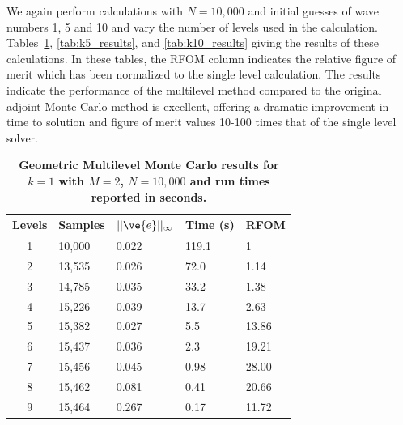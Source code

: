 \documentclass[note]{TechNote}
\begin{document}
We again perform calculations with $N=10,000$ and initial guesses of
wave numbers 1, 5 and 10 and vary the number of levels used in the
calculation. Tables~\ref{tab:k1_results}, \ref{tab:k5_results}, and
\ref{tab:k10_results} giving the results of these calculations. In
these tables, the RFOM column indicates the relative figure of merit
which has been normalized to the single level calculation. The results
indicate the performance of the multilevel method compared to the
original adjoint Monte Carlo method is excellent, offering a dramatic
improvement in time to solution and figure of merit values 10-100
times that of the single level solver.
\begin{table}[h!]
  \begin{center}
    \begin{tabular}{cllll}\hline\hline
      \multicolumn{1}{c}{\textbf{Levels}} & 
      \multicolumn{1}{l}{\textbf{Samples}} & 
      \multicolumn{1}{l}{\textbf{$||\ve{e}||_{\infty}$}} & 
      \multicolumn{1}{l}{\textbf{Time (s)}} & 
      \multicolumn{1}{l}{\textbf{RFOM}} \\
      \hline
      1 & 10,000 & 0.022 & 119.1 & 1 \\
      2 & 13,535 & 0.026 & 72.0 & 1.14 \\
      3 & 14,785 & 0.035 & 33.2 & 1.38 \\
      4 & 15,226 & 0.039 & 13.7 & 2.63 \\
      5 & 15,382 & 0.027 & 5.5 & 13.86 \\
      6 & 15,437 & 0.036 & 2.3 & 19.21 \\
      7 & 15,456 & 0.045 & 0.98 & 28.00 \\
      8 & 15,462 & 0.081 & 0.41 & 20.66 \\
      9 & 15,464 & 0.267 & 0.17 & 11.72 \\
      \hline\hline
    \end{tabular}
  \end{center}
  \caption{\textbf{Geometric Multilevel Monte Carlo results for $k =
      1$ with $M = 2$, $N = 10,000$ and run times reported in
      seconds.}}
  \label{tab:k1_results}
\end{table}
\end{document}
